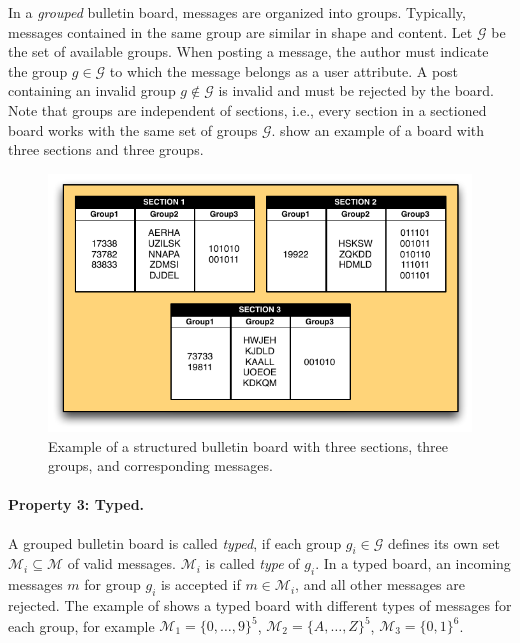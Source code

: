 \documentclass[bibtotoc,halfparskip,oneside]{scrreprt}
\begin{document}
In a \emph{grouped} bulletin board, messages are organized into groups. Typically, messages contained in the same group are similar in shape and content. Let $\mathcal{G}$ be the set of available  groups. When posting a message, the author must indicate the group $g\in\mathcal{G}$ to which the message belongs as a user attribute. A post containing an invalid group $g\not\in\mathcal{G}$ is invalid and must be rejected by the board. Note that groups are independent of sections, i.e., every section in a sectioned board works with the same set of groups $\mathcal{G}$.  show an example of a board with three sections and three groups.

\begin{figure}[ht]
\includegraphics[width=\textwidth]{figures/fig1}
\caption{Example of a structured bulletin board with three sections, three groups, and corresponding messages.}
\label{fig1}
\end{figure}

\paragraph*{Property 3: Typed.}
A grouped bulletin board is called \emph{typed}, if each group $g_i\in\mathcal{G}$ defines its own set  $\mathcal{M}_i\subseteq \mathcal{M}$ of valid messages. $\mathcal{M}_i$ is called \emph{type} of $g_i$.  In a typed board, an incoming messages $m$ for group $g_i$ is accepted if $m\in\mathcal{M}_i$, and all other messages are rejected. The example of  shows a typed board with different types of messages for each group, for example $\mathcal{M}_1=\{0,\ldots,9\}^5$, $\mathcal{M}_2=\{A,\ldots,Z\}^5$, $\mathcal{M}_3=\{0,1\}^6$.
\end{document}

